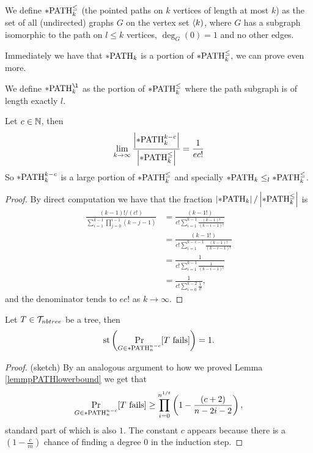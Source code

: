 \begin{defi}
We define $*\text{PATH}^\leq_k$ (the pointed paths on $k$ vertices of length at most $k$) as the set of all (undirected) graphs $G$ on the vertex set $\langle k)$, where $G$ has a subgraph isomorphic to the path on $l\leq k$ vertices, $\deg_G(0)=1$ and no other edges.
\end{defi}

Immediately we have that $*\text{PATH}_k$ is a portion of $*\text{PATH}^\leq_k,$ we can prove even more.

\begin{defi}
We define $\pPATH_k^{\l}$ as the portion of $*\text{PATH}^\leq_k$ where the path subgraph is of length exactly $l$. 
\end{defi}


\begin{lemm}
Let $c\in \mathbb{N}$, then 
\[\lim_{k\to\infty}\frac{\left|{*\text{PATH}_k^{k-c}}\right|}{\left|{*\text{PATH}^\leq_k}\right|}=\frac{1}{ec!}\]
So $*\text{PATH}_k^{k-c}$ is a large portion of $*\text{PATH}^\leq_k$ and specially $*\text{PATH}_k\leq_l *\text{PATH}^\leq_k$.
\end{lemm}
\begin{proof}
By direct computation we have that the fraction $\left|{*\text{PATH}_k}\right|/\left|{*\text{PATH}^\leq_k}\right|$ is
\begin{align}
\frac{(k-1)!/(c!)}{\sum_{i=1}^{k-1}\prod_{j=0}^{i-1}(k-j-1)}&=\frac{(k-1!)}{c!\sum_{i=1}^{k-1}\frac{(k-1)!}{(k-i-1)!}}\\
&=\frac{(k-1!)}{c!\sum_{i=1}^{k-c-1}\frac{(k-1)!}{(k-i-1)!}}\\
&=\frac{1}{c!\sum_{i=1}^{k-1}\frac{1}{(k-i-1)!}}\\
&=\frac{1}{c!\sum_{i=0}^{k-2}\frac{1}{i!}},
\end{align}
and the denominator tends to $ec!$ as $k\to\infty$.
\end{proof}

\begin{lemm}\label{lemmpathnnc}
Let $T\in \mathcal{T}_{nbtree}$ be a tree, then
\[\text{st}\left(\Pr_{G\in*\text{PATH}_{n}^{n-c}}[\text{$T$ fails}]\right )=1.\]
\end{lemm}
\begin{proof}(sketch)
By an analogous argument to how we proved Lemma \ref{lemmpPATHlowerbound} we get that
\[\Pr_{G\in*\text{PATH}_{n}^{n-c}}[T\text{ fails}]\geq \prod_{i=0}^{n^{1/t}}\left(1-\frac{(c+2)}{n-2i-2}\right),\]
standard part of which is also $1$. The constant $c$ appears because there is a $(1-\frac{c}{m})$ chance of finding a degree $0$ in the induction step.
\end{proof}


